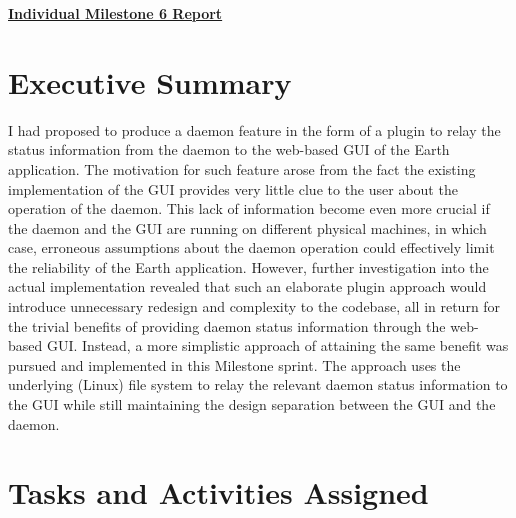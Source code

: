 \documentclass{article}
\begin{document}
\pagestyle{headings}

\begin{center}
{\LARGE\textbf{\underline{{Individual Milestone 6 Report}}}}
\end{center}

\section*{Executive Summary}

I had proposed to produce a daemon feature in the form of a plugin to relay the status information from the daemon to the web-based GUI of the Earth application. The motivation for such feature arose from the fact the existing implementation of the GUI provides very little clue to the user about the operation of the daemon. This lack of information become even more crucial if the daemon and the GUI are running on different physical machines, in which case, erroneous assumptions about the daemon operation could effectively limit the reliability of the Earth application. However, further investigation into the actual implementation revealed that such an elaborate plugin approach would introduce unnecessary redesign and complexity to the codebase, all in return for the trivial benefits of providing daemon status information through the web-based GUI. Instead, a more simplistic approach of attaining the same benefit was pursued and implemented in this Milestone sprint. The approach uses the underlying (Linux) file system to relay the relevant daemon status information to the GUI while still maintaining the design separation between the GUI and the daemon.

\section*{Tasks and Activities Assigned}
\end{document}
